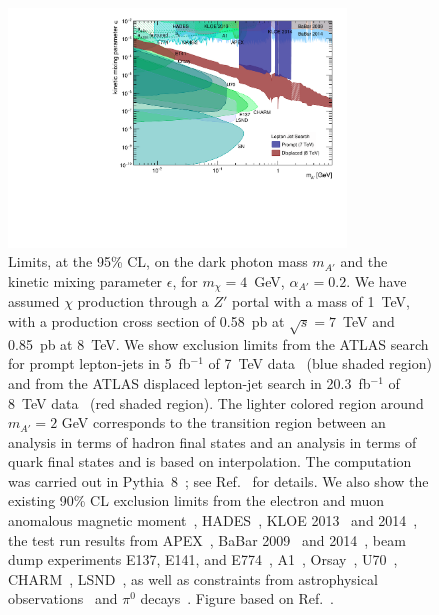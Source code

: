 \begin{figure}
  \begin{center}
    \includegraphics[width=0.8\textwidth]{figures/DS_DarkPhoton_Constraints.pdf}
  \end{center}
  \vspace{-0.7cm}
  \caption{
    Limits, at the 95\% CL, on the dark photon mass $m_{A'}$ and the kinetic mixing parameter $\epsilon$, for $m_\chi = 4$~GeV, $\alpha_{A'} = 0.2$. We have assumed $\chi$ production through a $Z'$ portal with a mass of 1~TeV, with a production cross section of 0.58~pb at $\sqrt{s} = 7$~TeV and 0.85~pb at 8~TeV. We show exclusion limits from the ATLAS search for prompt lepton-jets in 5~fb$^{-1}$ of 7~TeV data~\cite{Aad:2012qua} (blue shaded region) and from the ATLAS displaced lepton-jet search in 20.3~fb$^{-1}$ of 8~TeV data~\cite{Aad:2014yea} (red shaded region). The lighter colored region around $m_{A'}=2$ GeV corresponds to the transition region between an analysis in terms of hadron final states and an analysis in terms of quark final states and is based on interpolation. The computation was carried out in Pythia~8~\cite{Carloni:2010tw,Carloni:2011kk,Sjostrand:2014zea}; see Ref.~\cite{Buschmann:2015awa} for details. We also show the existing 90\% CL exclusion limits from the electron and muon anomalous magnetic moment~\cite{Pospelov:2008zw,Davoudiasl:2012ig,Endo:2012hp}, HADES~\cite{Agakishiev:2013fwl}, KLOE 2013~\cite{Babusci:2012cr} and 2014~\cite{Babusci:2014sta}, the test run results from APEX~\cite{Abrahamyan:2011gv}, BaBar 2009~\cite{Aubert:2009cp} and 2014~\cite{Lees:2014xha}, beam dump experiments E137, E141, and E774~\cite{Blumlein:2011mv,Bjorken:2009mm,Bross:1989mp}, A1~\cite{Merkel:2011ze}, Orsay~\cite{Davier:1989wz}, U70~\cite{Blumlein:2013cua}, CHARM~\cite{Gninenko:2012eq}, LSND~\cite{Essig:2010gu}, as well as constraints from astrophysical observations~\cite{Dent:2012mx,Dreiner:2013mua} and $\pi^0$ decays~\cite{CERNNA48/2:2015lha}. Figure based on Ref.~\cite{Buschmann:2015awa}.}
  \label{fig:radiating-dm-limits}
\end{figure}

